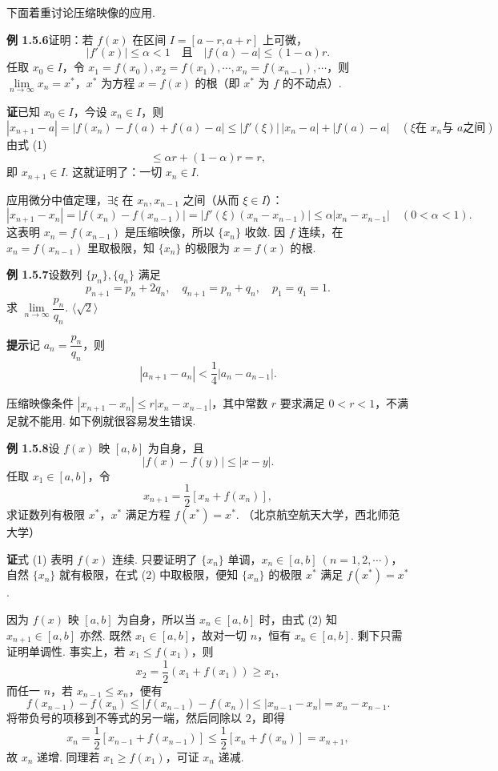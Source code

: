 \documentclass[UTF8, 12pt, fontset=fandol, oneside]{ctexart}
\begin{document}
下面着重讨论压缩映像的应用.

\noindent\textbf{例 1.5.6}\quad 证明：若 $f(x)$ 在区间 $I=[a-r,a+r]$ 上可微，
\[
  |f'(x)|\le \alpha<1\quad \text{且}\quad |f(a)-a|\le (1-\alpha)r.
\tag{1}
\]
任取 $x_0\in I$，令 $x_1=f(x_0),x_2=f(x_1),\cdots,x_n=f(x_{n-1}),\cdots$，则 $\lim\limits_{n\to\infty}x_n=x^*$，$x^*$ 为方程 $x=f(x)$ 的根（即 $x^*$ 为 $f$ 的不动点）.

\noindent\textbf{证}\quad 已知 $x_0\in I$，今设 $x_n\in I$，则
\[
  |x_{n+1}-a|
  =|f(x_n)-f(a)+f(a)-a|
  \le |f'(\xi)|\,|x_n-a|+|f(a)-a|\quad (\xi \text{在 }x_n\text{与 }a\text{之间})
\]
由式 (1)
\[
  \le \alpha r+(1-\alpha)r=r,
\]
即 $x_{n+1}\in I$. 这就证明了：一切 $x_n\in I$.

应用微分中值定理，$\exists \xi$ 在 $x_n,x_{n-1}$ 之间（从而 $\xi\in I$）：
\[
  |x_{n+1}-x_n|
  =|f(x_n)-f(x_{n-1})|
  =|f'(\xi)(x_n-x_{n-1})|
  \le \alpha |x_n-x_{n-1}|\quad (0<\alpha<1).
\]
这表明 $x_n=f(x_{n-1})$ 是压缩映像，所以 $\{x_n\}$ 收敛. 因 $f$ 连续，在 $x_n=f(x_{n-1})$ 里取极限，知 $\{x_n\}$ 的极限为 $x=f(x)$ 的根.

\noindent\textbf{例 1.5.7}\quad 设数列 $\{p_n\},\{q_n\}$ 满足
\[
  p_{n+1}=p_n+2q_n,\quad q_{n+1}=p_n+q_n,\quad p_1=q_1=1.
\]
求 $\lim\limits_{n\to\infty}\dfrac{p_n}{q_n}$. \hfill $\langle\sqrt2\rangle$

\noindent\textbf{提示}\quad 记 $a_n=\dfrac{p_n}{q_n}$，则
\[
  |a_{n+1}-a_n|<\frac14 |a_n-a_{n-1}|.
\]

压缩映像条件 $|x_{n+1}-x_n|\le r|x_n-x_{n-1}|$，其中常数 $r$ 要求满足 $0<r<1$，不满足就不能用. 如下例就很容易发生错误.

\noindent\textbf{例 1.5.8}\quad 设 $f(x)$ 映 $[a,b]$ 为自身，且
\[
  |f(x)-f(y)|\le |x-y|.
\tag{1}
\]
任取 $x_1\in [a,b]$，令
\[
  x_{n+1}=\frac12[x_n+f(x_n)],
\tag{2}
\]
求证数列有极限 $x^*$，$x^*$ 满足方程 $f(x^*)=x^*$. （北京航空航天大学，西北师范大学）

\noindent\textbf{证}\quad 式 (1) 表明 $f(x)$ 连续. 只要证明了 $\{x_n\}$ 单调，$x_n\in [a,b]\ (n=1,2,\cdots)$，自然 $\{x_n\}$ 就有极限，在式 (2) 中取极限，便知 $\{x_n\}$ 的极限 $x^*$ 满足 $f(x^*)=x^*$.

因为 $f(x)$ 映 $[a,b]$ 为自身，所以当 $x_n\in [a,b]$ 时，由式 (2) 知 $x_{n+1}\in [a,b]$ 亦然. 既然 $x_1\in [a,b]$，故对一切 $n$，恒有 $x_n\in [a,b]$. 剩下只需证明单调性. 事实上，若 $x_1\le f(x_1)$，则
\[
  x_2=\frac12(x_1+f(x_1))\ge x_1,
\]
而任一 $n$，若 $x_{n-1}\le x_n$，便有
\[
  f(x_{n-1})-f(x_n)\le |f(x_{n-1})-f(x_n)|
  \le |x_{n-1}-x_n|=x_n-x_{n-1}.
\]
将带负号的项移到不等式的另一端，然后同除以 $2$，即得
\[
  x_n=\frac12[x_{n-1}+f(x_{n-1})]\le \frac12[x_n+f(x_n)]=x_{n+1},
\]
故 $x_n$ 递增. 同理若 $x_1\ge f(x_1)$，可证 $x_n$ 递减.
\end{document}

